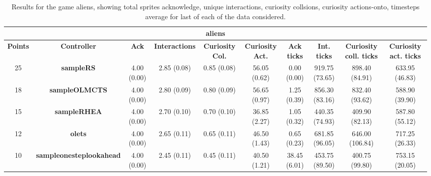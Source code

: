 \begin{table*}[!t]
\begin{center}
\begin{adjustbox}{width=1\textwidth}
\begin{tabular}{|c|c|c|c|c|c|c|c|c|c|}
\multicolumn{10}{c}{\textbf{aliens}}\\
\hline
\textbf{Points} & \textbf{Controller} & \textbf{Ack} & \textbf{Interactions} & \textbf{Curiosity Col.} & \textbf{Curiosity Act.} & \textbf{Ack ticks} & \textbf{Int. ticks} & \textbf{Curiosity coll. ticks} & \textbf{Curiosity act. ticks}\\
\hline
25 & \textbf{sampleRS} & 4.00 (0.00) & 2.85 (0.08) & 0.85 (0.08) & 56.05 (0.62) & 0.00 (0.00) & 919.75 (73.65) & 898.40 (84.91) & 633.95 (46.83)
 \\
\hline
18 & \textbf{sampleOLMCTS} & 4.00 (0.00) & 2.80 (0.09) & 0.80 (0.09) & 56.65 (0.97) & 1.25 (0.39) & 856.30 (83.16) & 832.40 (93.62) & 588.90 (39.90)
 \\
\hline
15 & \textbf{sampleRHEA} & 4.00 (0.00) & 2.70 (0.10) & 0.70 (0.10) & 36.85 (2.27) & 1.05 (0.32) & 440.35 (74.93) & 409.90 (82.13) & 587.80 (55.12)
 \\
\hline
12 & \textbf{olets} & 4.00 (0.00) & 2.65 (0.11) & 0.65 (0.11) & 46.50 (1.43) & 0.65 (0.23) & 681.85 (96.05) & 646.00 (106.84) & 717.25 (26.33)
 \\
\hline
10 & \textbf{sampleonesteplookahead} & 4.00 (0.00) & 2.45 (0.11) & 0.45 (0.11) & 40.50 (1.21) & 38.45 (6.01) & 453.75 (89.50) & 400.75 (99.80) & 753.15 (20.05)
 \\
\hline
\end{tabular}
\end{adjustbox}
\caption{Results for the game aliens, showing total sprites acknowledge, unique interactions, curiosity collsions, curiosity actions-onto, timesteps average for last of each of the data considered.}
\label{tab:weights}
\end{center}
\end{table*}
